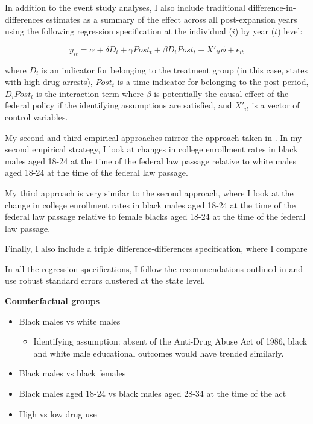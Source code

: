 \documentclass{article}
\begin{document}
In addition to the event study analyses, I also include traditional difference-in-differences estimates as a summary of the effect across all post-expansion years using the following regression specification at the individual ($i$) by year ($t$) level: 

\begin{equation} \label{eq:did}
  y_{it} = \alpha + \delta D_i + \gamma Post_t + \beta D_i Post_t + X'_{it}\phi + \epsilon_{it}
\end{equation}

where $D_{i}$ is an indicator for belonging to the treatment group (in this case, states with high drug arrests), $Post_t$ is a time indicator for belonging to the post-period, $D_i Post_t$ is the interaction term where $\beta$ is potentially the causal effect of the federal policy if the identifying assumptions are satisfied, and $X'_{it}$ is a vector of control variables.

My second and third empirical approaches mirror the approach taken in \cite {britton2022}. In my second empirical strategy, I look at changes in college enrollment rates in black males aged 18-24 at the time of the federal law passage relative to white males aged 18-24 at the time of the federal law passage.

My third approach is very similar to the second approach, where I look at the change in college enrollment rates in black males aged 18-24 at the time of the federal law passage relative to female blacks aged 18-24 at the time of the federal law passage.

Finally, I also include a triple difference-differences specification, where I compare

In all the regression specifications, I follow the recommendations outlined in \cite{duflo_did} and use robust standard errors clustered at the state level.

\textbf{Counterfactual groups}
\begin{itemize}[itemsep=0.05mm, parsep=0pt]
  \item Black males vs white males
  \begin{itemize}
    \item Identifying assumption: absent of the Anti-Drug Abuse Act of 1986, black and white male educational outcomes would have trended similarly.
  \end{itemize}
  \item Black males vs black females
  \item Black males aged 18-24 vs black males aged 28-34 at the time of the act
  \item High vs low drug use
\end{itemize}
\end{document}
